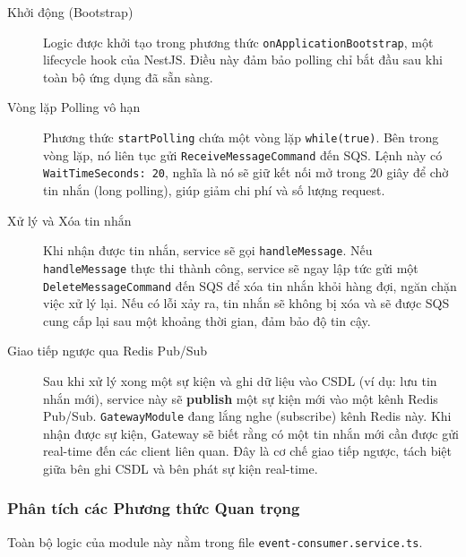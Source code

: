 \begin{description}
    \item[Khởi động (Bootstrap)] Logic được khởi tạo trong phương thức \texttt{onApplicationBootstrap}, một lifecycle hook của NestJS. Điều này đảm bảo polling chỉ bắt đầu sau khi toàn bộ ứng dụng đã sẵn sàng.
    
    \item[Vòng lặp Polling vô hạn] Phương thức \texttt{startPolling} chứa một vòng lặp \texttt{while(true)}. Bên trong vòng lặp, nó liên tục gửi \texttt{ReceiveMessageCommand} đến SQS. Lệnh này có \texttt{WaitTimeSeconds: 20}, nghĩa là nó sẽ giữ kết nối mở trong 20 giây để chờ tin nhắn (long polling), giúp giảm chi phí và số lượng request.
    
    \item[Xử lý và Xóa tin nhắn] Khi nhận được tin nhắn, service sẽ gọi \texttt{handleMessage}. Nếu \texttt{handleMessage} thực thi thành công, service sẽ ngay lập tức gửi một \texttt{DeleteMessageCommand} đến SQS để xóa tin nhắn khỏi hàng đợi, ngăn chặn việc xử lý lại. Nếu có lỗi xảy ra, tin nhắn sẽ không bị xóa và sẽ được SQS cung cấp lại sau một khoảng thời gian, đảm bảo độ tin cậy.
    
    \item[Giao tiếp ngược qua Redis Pub/Sub] Sau khi xử lý xong một sự kiện và ghi dữ liệu vào CSDL (ví dụ: lưu tin nhắn mới), service này sẽ \textbf{publish} một sự kiện mới vào một kênh Redis Pub/Sub. \texttt{GatewayModule} đang lắng nghe (subscribe) kênh Redis này. Khi nhận được sự kiện, Gateway sẽ biết rằng có một tin nhắn mới cần được gửi real-time đến các client liên quan. Đây là cơ chế giao tiếp ngược, tách biệt giữa bên ghi CSDL và bên phát sự kiện real-time.
\end{description}

\subsubsection{Phân tích các Phương thức Quan trọng}

Toàn bộ logic của module này nằm trong file \texttt{event-consumer.service.ts}.

